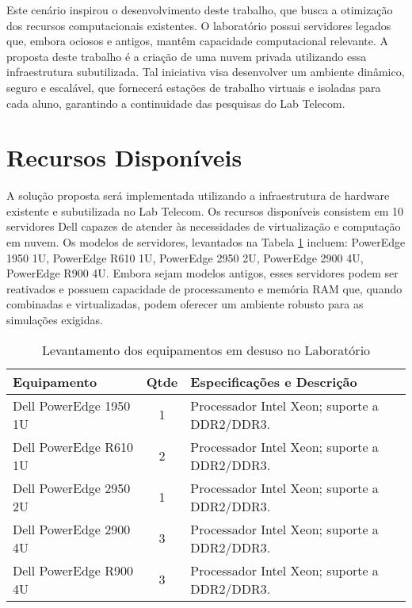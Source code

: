 Este cenário inspirou o desenvolvimento deste trabalho, que busca a otimização dos recursos computacionais existentes. O laboratório possui servidores legados que, embora ociosos e antigos, mantêm capacidade computacional relevante. A proposta deste trabalho é a criação de uma nuvem privada utilizando essa infraestrutura subutilizada. Tal iniciativa visa desenvolver um ambiente dinâmico, seguro e escalável, que fornecerá estações de trabalho virtuais e isoladas para cada aluno, garantindo a continuidade das pesquisas do Lab Telecom.

\section{Recursos Disponíveis}

A solução proposta será implementada utilizando a infraestrutura de hardware existente e subutilizada no Lab Telecom. Os recursos disponíveis consistem em 10 servidores Dell capazes de atender às necessidades de virtualização e computação em nuvem. Os modelos de servidores, levantados na Tabela \ref{tab:lab_equipamentos_parados} incluem: PowerEdge 1950 1U, PowerEdge R610 1U, PowerEdge 2950 2U, PowerEdge 2900 4U, PowerEdge R900 4U. Embora sejam modelos antigos, esses servidores podem ser reativados e possuem capacidade de processamento e memória RAM que, quando combinadas e virtualizadas, podem oferecer um ambiente robusto para as simulações exigidas.

\begin{table}[h]
    \centering
    \caption{Levantamento dos equipamentos em desuso no Laboratório}
    \label{tab:lab_equipamentos_parados}
    \begin{tabular}{|l|c|p{6cm}|}
        \hline
        \textbf{Equipamento} & \textbf{Qtde} & \textbf{Especificações e Descrição} \\ \hline \hline
        Dell PowerEdge 1950 1U & 1 & Processador Intel Xeon; suporte a DDR2/DDR3. \\ \hline
        Dell PowerEdge R610 1U & 2 & Processador Intel Xeon; suporte a DDR2/DDR3. \\ \hline
        Dell PowerEdge 2950 2U & 1 & Processador Intel Xeon; suporte a DDR2/DDR3. \\ \hline
        Dell PowerEdge 2900 4U & 3 & Processador Intel Xeon; suporte a DDR2/DDR3. \\ \hline
        Dell PowerEdge R900 4U & 3 & Processador Intel Xeon; suporte a DDR2/DDR3. \\ \hline
    \end{tabular}
\end{table}

